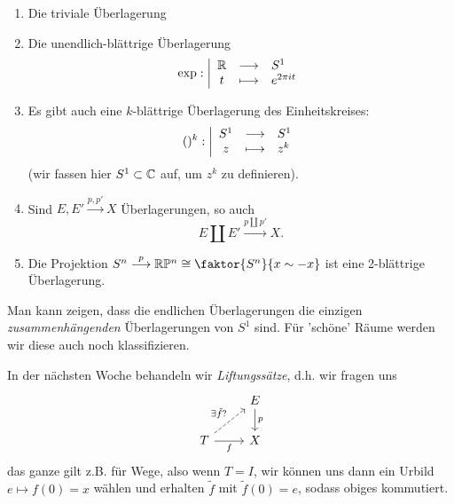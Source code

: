 \begin{example}
    \begin{enumerate}[1)]
        \item Die triviale Überlagerung
        \item Die unendlich-blättrige Überlagerung
                \begin{equation*}
                \exp: \left| \begin{array}{c c l} 
                \mathbb{R} & \longrightarrow & S^1 \\
                t & \longmapsto &  e^{2\pi it}
                \end{array} \right.
            \end{equation*}
        \item Es gibt auch eine $k$-blättrige Überlagerung des Einheitskreises:
                \begin{equation*}
                    ()^k : \left| \begin{array}{c c l} 
                S^1 & \longrightarrow & S^1 \\
                z & \longmapsto &  z^k
                \end{array} \right.
            \end{equation*}
            (wir fassen hier $S^1 \subset \mathbb{C}$ auf, um $z^k$ zu definieren).
        \item Sind  $E,E' \stackrel{p,p'}{\longrightarrow} X$ Überlagerungen, so auch
            \[
            E \coprod E' \stackrel{p \coprod p'}{\longrightarrow} X
            .\] 
        \item Die Projektion $S^n \stackrel{p}{\longrightarrow} \R \mathbb{P}^n \cong \faktor{S^n}{x \sim  -x}$ ist eine 2-blättrige Überlagerung.
    \end{enumerate}    
\end{example}

\begin{oral}
    Man kann zeigen, dass die endlichen Überlagerungen die einzigen \textit{zusammenhängenden} Überlagerungen von $S^1$ sind. Für 'schöne' Räume werden wir diese auch noch klassifizieren.
\end{oral}

In der nächsten Woche behandeln wir \textit{Liftungssätze}, d.h. wir fragen uns
\[
\begin{tikzcd}
    & E \ar{d}{p} \\
    T \ar[dashed]{ur}{\exists \tilde{f}?} \ar[swap]{r}{f} & X
\end{tikzcd}
\]
das ganze gilt z.B. für Wege, also wenn $T = I$, wir können uns dann ein Urbild  $e \mapsto f(0) = x$ wählen und erhalten  $\tilde{f}$ mit $\tilde{f}(0) = e$, sodass obiges kommutiert.

